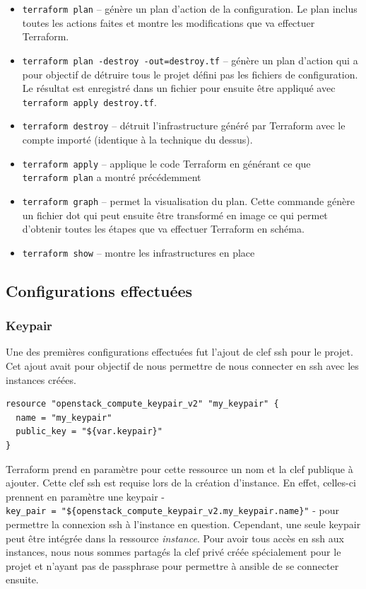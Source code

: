 \documentclass[]{article}
\providecommand{\tightlist}{%
  \setlength{\itemsep}{0pt}\setlength{\parskip}{0pt}}
\begin{document}
\begin{itemize}
\tightlist
\item
  \texttt{terraform\ plan} -- génère un plan d'action de la
  configuration. Le plan inclus toutes les actions faites et montre les
  modifications que va effectuer Terraform.
\item
  \texttt{terraform\ plan\ -destroy\ -out=destroy.tf} -- génère un plan
  d'action qui a pour objectif de détruire tous le projet défini pas les
  fichiers de configuration. Le résultat est enregistré dans un fichier
  pour ensuite être appliqué avec \texttt{terraform\ apply\ destroy.tf}.
\item
  \texttt{terraform\ destroy} -- détruit l'infrastructure généré par
  Terraform avec le compte importé (identique à la technique du dessus).
\item
  \texttt{terraform\ apply} -- applique le code Terraform en générant ce
  que \texttt{terraform\ plan} a montré précédemment
\item
  \texttt{terraform\ graph} -- permet la visualisation du plan. Cette
  commande génère un fichier dot qui peut ensuite être transformé en
  image ce qui permet d'obtenir toutes les étapes que va
  effectuer Terraform en schéma.
\item
  \texttt{terraform\ show} -- montre les infrastructures en place
\end{itemize}

\subsection{Configurations
effectuées}\label{configurations-effectuuxe9es}

\subsubsection{Keypair}\label{keypair}

Une des premières configurations effectuées fut l'ajout de clef ssh pour
le projet. Cet ajout avait pour objectif de nous permettre de nous
connecter en ssh avec les instances créées.
\begin{verbatim}
resource "openstack_compute_keypair_v2" "my_keypair" {
  name = "my_keypair"
  public_key = "${var.keypair}"
}
\end{verbatim}
Terraform prend en paramètre pour cette ressource un nom et la clef
publique à ajouter. Cette clef ssh est requise lors de la création
d'instance. En effet, celles-ci prennent en paramètre une keypair -
\texttt{key\_pair\ =\ "\$\{openstack\_compute\_keypair\_v2.my\_keypair.name\}"}
- pour permettre la connexion ssh à l'instance en question. Cependant,
une seule keypair peut être intégrée dans la ressource \emph{instance}.
Pour avoir tous accès en ssh aux instances, nous nous sommes partagés la
clef privé créée spécialement pour le projet et n'ayant pas de
passphrase pour permettre à ansible de se connecter ensuite.
\end{document}
